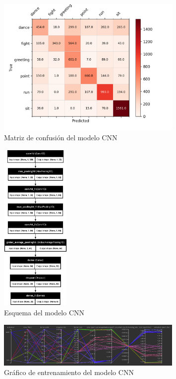 \begin{figure}[H]
    \centering
    \includegraphics[width=0.8\textwidth]{Imagenes/Bitmap/CM_best-cnn1.0.png}
    \caption{Matriz de confusión del modelo CNN}
    \label{fig:cnn-1.0-matriz-ejemplo}
\end{figure}
\begin{figure}[H]
    \centering
    \includegraphics[width=0.3\textwidth]{Imagenes/Bitmap/best-cnn1.0.png}
    \caption{Esquema del modelo CNN}
    \label{fig:cnn-1.0-ejemplo}
\end{figure}

\begin{figure}[H]
    \centering
    \includegraphics[width=0.8\textwidth]{Imagenes/Bitmap/tb-cnn-1.0.png}
    \caption{Gráfico de entrenamiento del modelo CNN}
    \label{fig:cnn-1.0-grafico-ejemplo}
\end{figure}

